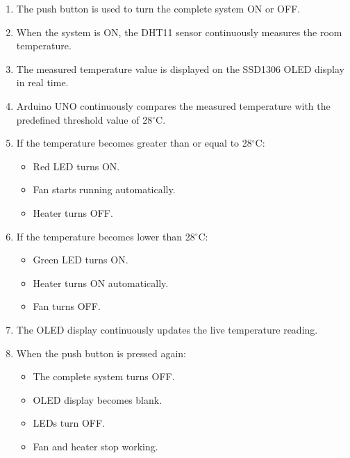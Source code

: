 \begin{enumerate}

\item The push button is used to turn the complete system ON or OFF.

\item When the system is ON, the DHT11 sensor continuously measures the room temperature.

\item The measured temperature value is displayed on the SSD1306 OLED display in real time.

\item Arduino UNO continuously compares the measured temperature with the predefined threshold value of 28$^\circ$C.

\item If the temperature becomes greater than or equal to 28$^\circ$C:

\begin{itemize}
    \item Red LED turns ON.
    \item Fan starts running automatically.
    \item Heater turns OFF.
\end{itemize}

\item If the temperature becomes lower than 28$^\circ$C:

\begin{itemize}
    \item Green LED turns ON.
    \item Heater turns ON automatically.
    \item Fan turns OFF.
\end{itemize}

\item The OLED display continuously updates the live temperature reading.

\item When the push button is pressed again:

\begin{itemize}
    \item The complete system turns OFF.
    \item OLED display becomes blank.
    \item LEDs turn OFF.
    \item Fan and heater stop working.
\end{itemize}

\end{enumerate}


